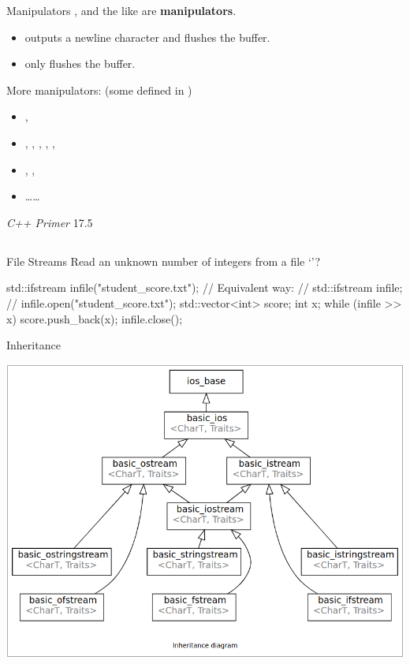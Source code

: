 \begin{frame}[fragile]{Manipulators}
    ,  and the like are \textbf{manipulators}.
    \begin{itemize}
        \item {} outputs a newline character and flushes the buffer.
        \item {} only flushes the buffer.
    \end{itemize}
    More manipulators: (some defined in )
    \begin{itemize}
        \item {}, 
        \item {}, , , , , 
        \item {}, , 
        \item \dots\dots
    \end{itemize}
    \textit{C++ Primer} 17.5
\end{frame}

\subsection{}

\begin{frame}[fragile]{File Streams}
    Read an unknown number of integers from a file `'?
    \begin{cpp}
std::ifstream infile("student_score.txt");
// Equivalent way:
// std::ifstream infile;
// infile.open("student_score.txt");
std::vector<int> score;
int x;
while (infile >> x)
  score.push_back(x);
infile.close();
    \end{cpp}
\end{frame}

\begin{frame}{Inheritance}
    \begin{center}
        \includegraphics[scale=0.3]{img/iostream_inheritance.png}
    \end{center}
\end{frame}

